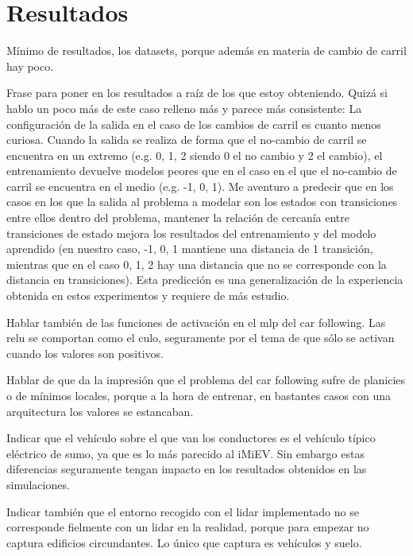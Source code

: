 \chapter{Resultados}
\label{ch:results}

Mínimo de resultados, los datasets, porque además en materia de cambio de carril hay poco.

Frase para poner en los resultados a raíz de los que estoy obteniendo. Quizá si hablo un poco más de este caso relleno más y parece más consistente: La configuración de la salida en el caso de los cambios de carril es cuanto menos curiosa. Cuando la salida se realiza de forma que el no-cambio de carril se encuentra en un extremo (e.g. 0, 1, 2 siendo 0 el no cambio y 2 el cambio), el entrenamiento devuelve modelos peores que en el caso en el que el no-cambio de carril se encuentra en el medio (e.g. -1, 0, 1). Me aventuro a predecir que en los casos en los que la salida al problema a modelar son los estados con transiciones entre ellos dentro del problema, mantener la relación de cercanía entre transiciones de estado mejora los resultados del entrenamiento y del modelo aprendido (en nuestro caso, -1, 0, 1 mantiene una distancia de 1 transición, mientras que en el caso 0, 1, 2 hay una distancia que no se corresponde con la distancia en transiciones). Esta predicción es una generalización de la experiencia obtenida en estos experimentos y requiere de más estudio.

Hablar también de las funciones de activación en el mlp del car following. Las relu se comportan como el culo, seguramente por el tema de que sólo se activan cuando los valores son positivos.

Hablar de que da la impresión que el problema del car following sufre de planicies o de mínimos locales, porque a la hora de entrenar, en bastantes casos con una arquitectura los valores se estancaban.

Indicar que el vehículo sobre el que van los conductores es el vehículo típico eléctrico de sumo, ya que es lo más parecido al iMiEV. Sin embargo estas diferencias seguramente tengan impacto en los resultados obtenidos en las simulaciones.

Indicar también que el entorno recogido con el \ac{lidar} implementado no se corresponde fielmente con un \ac{lidar} en la realidad, porque para empezar no captura edificios circundantes. Lo único que captura es vehículos y suelo.